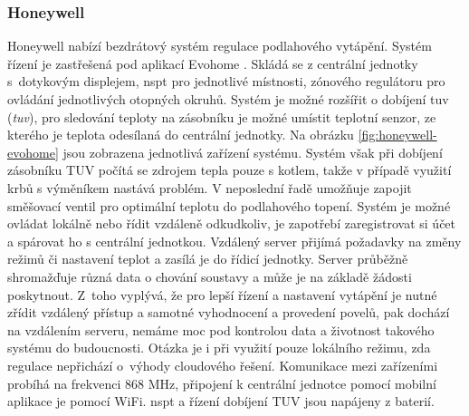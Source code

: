 \subsubsection{Honeywell}
Honeywell nabízí bezdrátový systém regulace podlahového vytápění. Systém řízení je zastřešená pod aplikací Evohome \cite{honeywell-evohome-stranky}. Skládá se z centrální jednotky s~dotykovým displejem, \acrshort{nspt} pro jednotlivé místnosti, zónového regulátoru pro ovládání jednotlivých otopných okruhů. Systém je možné rozšířit o dobíjení \acrshort{tuv} (\textit{\acrlong{tuv}}), pro sledování teploty na zásobníku je možné umístit teplotní senzor, ze kterého je teplota odesílaná do centrální jednotky. Na obrázku \ref{fig:honeywell-evohome} jsou zobrazena jednotlivá zařízení systému. Systém však při dobíjení zásobníku TUV počítá se zdrojem tepla pouze s kotlem, takže v případě využití krbů s výměníkem nastává problém. V neposlední řadě umožňuje zapojit směšovací ventil pro optimální teplotu do podlahového topení. Systém je možné ovládat lokálně nebo řídit vzdáleně odkudkoliv, je zapotřebí zaregistrovat si účet a spárovat ho s  centrální jednotkou. Vzdálený server přijímá požadavky na změny režimů či nastavení teplot a zasílá je do řídicí jednotky. Server průběžně shromažďuje různá data o chování soustavy a může je na základě žádosti poskytnout. Z~toho vyplývá, že pro lepší řízení a nastavení vytápění je nutné zřídit vzdálený přístup a samotné vyhodnocení a provedení povelů, pak dochází na vzdálením serveru, nemáme moc pod kontrolou data a životnost takového systému do budoucnosti. Otázka je i při využití pouze lokálního režimu, zda regulace nepřichází o~výhody cloudového řešení. Komunikace mezi zařízeními probíhá na frekvenci 868 MHz, připojení k centrální jednotce pomocí mobilní aplikace je pomocí WiFi. \acrshort{nspt} a řízení dobíjení TUV jsou napájeny z baterií.




